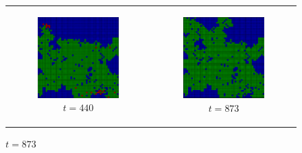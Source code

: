 \begin{figure}
\begin{center}
\begin{tabular}{c c}
		\begin{subfigure}[b]{0.4\textwidth}
			\centering
			\includegraphics[width=.6\textwidth, angle=0]{./../shared/fig/spatial/SIR_spatial_52x52_440time.png}
			\caption{$t = 440$}
			\label{fig:sir_spatial_440}
		\end{subfigure}
		
		& 
		
		\begin{subfigure}[b]{0.4\textwidth}
			\centering
			\includegraphics[width=.6\textwidth, angle=0]{./../shared/fig/spatial/SIR_spatial_52x52_873time.png}
			\caption{$t = 873$}
			\label{fig:sir_spatial_873}
		\end{subfigure}
	\end{tabular}
	

\end{center}
\end{figure}

